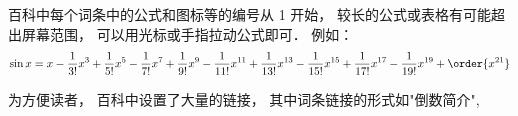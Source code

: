 
\begin{issues}
\issueDraft
\end{issues}

百科中每个词条中的公式和图标等的编号从 1 开始， 较长的公式或表格有可能超出屏幕范围， 可以用光标或手指拉动公式即可． 例如：
\begin{equation}
\sin x = x - \frac{1}{3!} x^3 + \frac{1}{5!} x^5 - \frac{1}{7!} x^7+\frac{1}{9!} x^9-\frac{1}{11!} x^{11}+\frac{1}{13!} x^{13}-\frac{1}{15!} x^{15}+\frac{1}{17!} x^{17}-\frac{1}{19!} x^{19}+ \order{x^{21}}
\end{equation}

为方便读者， 百科中设置了大量的链接， 其中词条链接的形式如"倒数简介",